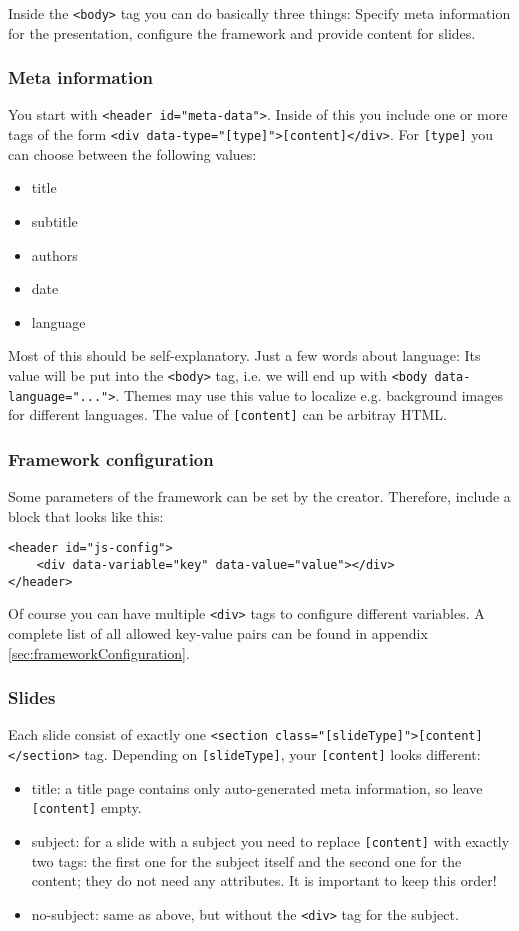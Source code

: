 \documentclass{scrartcl}
\newcommand{\code}[1]{{\tt #1}}
\newcommand{\tag}[1]{\code{<#1>}}
\begin{document}
Inside the \tag{body} tag you can do basically three things: Specify meta information for the presentation, configure the framework and provide content for slides.

\subsubsection{Meta information} 

You start with \tag{header id="meta-data"}. Inside of this you include one or more tags of the form \tag{div data-type="[type]"}\code{[content]}\tag{/div}. For \code{[type]} you can choose between the following values:
\begin{itemize}
\item title
\item subtitle
\item authors
\item date
\item language
\end{itemize}
Most of this should be self-explanatory. Just a few words about language: Its value will be put into the \tag{body} tag, i.e. we will end up with \tag{body data-language="..."}. Themes may use this value to localize e.g. background images for different languages. The value of \code{[content]} can be arbitray HTML.

\subsubsection{Framework configuration} 
\label{subsubsection:frameworkConfiguration}

Some parameters of the framework can be set by the creator. Therefore, include a block that looks like this:
\begin{lstlisting}
<header id="js-config">
	<div data-variable="key" data-value="value"></div>
</header>
\end{lstlisting}
Of course you can have multiple \tag{div} tags to configure different variables. A complete list of all allowed key-value pairs can be found in appendix \ref{sec:frameworkConfiguration}.

\subsubsection{Slides} Each slide consist of exactly one \tag{section class="[slideType]"}\code{[content]}\tag{/section} tag. Depending on \code{[slideType]}, your \code{[content]} looks different:
\begin{itemize}
\item title: a title page contains only auto-generated meta information, so leave \code{[content]} empty.
\item subject: for a slide with a subject you need to replace \code{[content]} with exactly two tags: the first one for the subject itself and the second one for the content; they do not need any attributes. It is important to keep this order!
\item no-subject: same as above, but without the \tag{div} tag for the subject.
\end{itemize}
\end{document}
